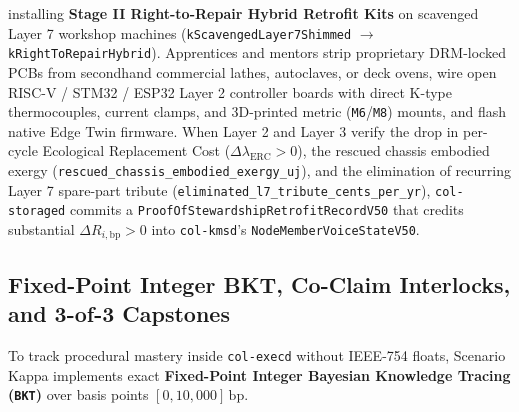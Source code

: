 \begin{enumerate}
    installing \textbf{Stage II Right-to-Repair Hybrid Retrofit Kits} on scavenged Layer 7
    workshop machines (\texttt{kScavengedLayer7Shimmed} $\to$ \texttt{kRightToRepairHybrid}).
    Apprentices and mentors strip proprietary DRM-locked PCBs from secondhand commercial lathes,
    autoclaves, or deck ovens, wire open RISC-V / STM32 / ESP32 Layer 2 controller boards with
    direct K-type thermocouples, current clamps, and 3D-printed metric (\texttt{M6}/\texttt{M8})
    mounts, and flash native Edge Twin firmware. When Layer 2 and Layer 3 verify the drop in
    per-cycle Ecological Replacement Cost ($\Delta\lambda_{\mathrm{ERC}} > 0$), the rescued
    chassis embodied exergy (\texttt{rescued\_chassis\_embodied\_exergy\_uj}), and the
    elimination of recurring Layer 7 spare-part tribute (\texttt{eliminated\_l7\_tribute\_cents\_per\_yr}),
    \texttt{col-storaged} commits a \texttt{ProofOfStewardshipRetrofitRecordV50} that credits
    substantial $\Delta R_{i,\mathrm{bp}} > 0$ into \texttt{col-kmsd}'s
    \texttt{NodeMemberVoiceStateV50}.
\end{enumerate}

\subsection{Fixed-Point Integer BKT, Co-Claim Interlocks, and 3-of-3 Capstones}

To track procedural mastery inside \texttt{col-execd} without IEEE-754 floats, Scenario Kappa
implements exact \textbf{Fixed-Point Integer Bayesian Knowledge Tracing (\texttt{BKT})}
\parencite{corbett1995bkt} over basis points $[0, 10{,}000]\,\mathrm{bp}$.


